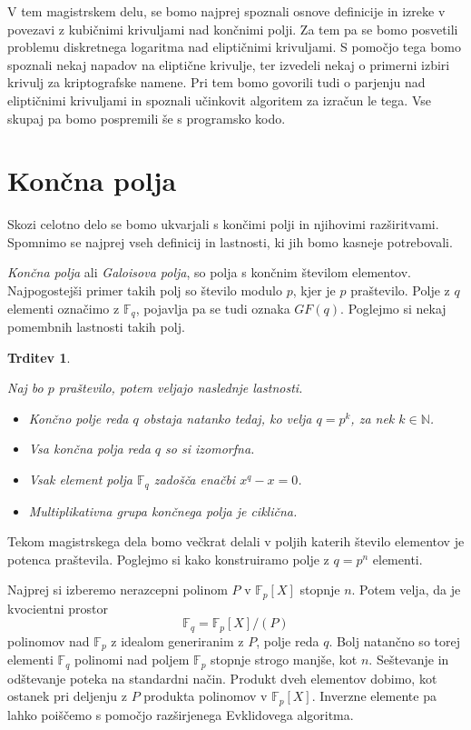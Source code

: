 \documentclass[12pt,a4paper,twoside]{article}
\theoremstyle{definition} %
\theoremstyle{plain} %
\newtheorem{trditev}[definicija]{Trditev}
\numberwithin{equation}{section}  %
\newcommand{\N}{\mathbb N}
\newcommand{\F}{\mathbb F}
\begin{document}
V tem magistrskem delu, se bomo najprej spoznali osnove definicije in izreke v povezavi z kubičnimi krivuljami nad končnimi polji. Za tem pa se bomo posvetili problemu diskretnega logaritma nad eliptičnimi krivuljami. S pomočjo tega bomo spoznali nekaj napadov na eliptične krivulje, ter izvedeli nekaj o primerni izbiri krivulj za kriptografske namene. Pri tem bomo govorili tudi o parjenju nad eliptičnimi krivuljami in spoznali učinkovit algoritem za izračun le tega. Vse skupaj pa bomo pospremili še s programsko kodo.


\newpage



\section{Končna polja}

Skozi celotno delo se bomo ukvarjali s končimi polji in njihovimi razširitvami. Spomnimo se najprej vseh definicij in lastnosti, ki jih bomo kasneje potrebovali.

\emph{Končna polja} ali \emph{Galoisova polja}, so polja s končnim številom elementov. Najpogostejši primer takih polj so število modulo $p$, kjer je $p$ praštevilo. Polje z $q$ elementi označimo z $\F_q$, pojavlja pa se tudi oznaka $GF(q)$. Poglejmo si nekaj pomembnih lastnosti takih polj.
\begin{trditev}~

Naj bo $p$ praštevilo, potem veljajo naslednje lastnosti.
\begin{itemize}
\item Končno polje reda $q$ obstaja natanko tedaj, ko velja $q=p^k$, za nek $k \in \N$.
\item Vsa končna polja reda $q$ so si izomorfna.
\item Vsak element polja $\F_q$ zadošča enačbi $x^{q} -x = 0$.
\item Multiplikativna grupa končnega polja je ciklična.

\end{itemize}
\end{trditev}

Tekom magistrskega dela bomo večkrat delali v poljih katerih število elementov je potenca praštevila. Poglejmo si kako konstruiramo polje z $q = p^n$ elementi.

Najprej si izberemo nerazcepni polinom $P$ v $\F_p[X]$ stopnje $n$. Potem velja, da je kvocientni prostor
$$\F_q = \F_p[X]/(P)$$
polinomov nad $\F_p$ z idealom generiranim z $P$, polje reda $q$.
Bolj natančno so torej elementi $\F_q$ polinomi nad poljem $\F_p$ stopnje strogo manjše, kot $n$. Seštevanje in odštevanje  poteka na standardni način. Produkt dveh elementov dobimo, kot ostanek pri deljenju z $P$ produkta polinomov v $\F_p[X]$. Inverzne elemente pa lahko poiščemo s pomočjo razširjenega Evklidovega algoritma.
\end{document}
